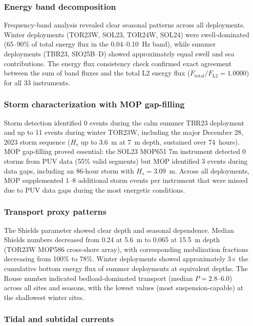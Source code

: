 \subsubsection{Energy band decomposition}

Frequency-band analysis revealed clear seasonal patterns across all
deployments. Winter deployments (TOR23W, SOL23, TOR24W, SOL24) were
swell-dominated (65--90\% of total energy flux in the 0.04--0.10~Hz
band), while summer deployments (TBR23, SIO25B--D) showed
approximately equal swell and sea contributions. The energy flux
consistency check confirmed exact agreement between the sum of band
fluxes and the total L2 energy flux ($F_\mathrm{total}/F_\mathrm{L2}
= 1.0000$) for all 33 instruments.

\subsubsection{Storm characterization with MOP gap-filling}

Storm detection identified 0 events during the calm summer TBR23
deployment and up to 11 events during winter TOR23W, including the
major December 28, 2023 storm sequence ($H_s$ up to 3.6~m at 7~m
depth, sustained over 74~hours). MOP gap-filling proved essential:
the SOL23 MOP651 7m instrument detected 0 storms from PUV data
(55\% valid segments) but MOP identified 3 events during data gaps,
including an 86-hour storm with $H_s = 3.09$~m. Across all
deployments, MOP supplemented 1--8 additional storm events per
instrument that were missed due to PUV data gaps during the most
energetic conditions.

\subsubsection{Transport proxy patterns}

The Shields parameter showed clear depth and seasonal dependence.
Median Shields numbers decreased from 0.24 at 5.6~m to 0.065 at
15.5~m depth (TOR23W MOP586 cross-shore array), with corresponding
mobilization fractions decreasing from 100\% to 78\%. Winter
deployments showed approximately 3$\times$ the cumulative bottom
energy flux of summer deployments at equivalent depths. The Rouse
number indicated bedload-dominated transport (median $P = 2.8$--6.0)
across all sites and seasons, with the lowest values (most
suspension-capable) at the shallowest winter sites.

\subsubsection{Tidal and subtidal currents}


